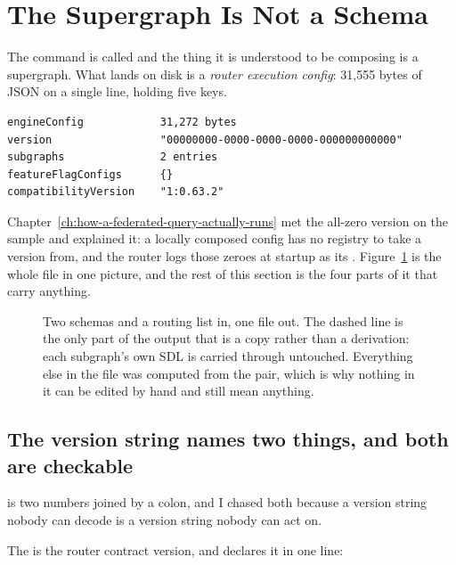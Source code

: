 \section{The Supergraph Is Not a Schema}
\label{sec:ch09-not-a-schema}
%

The command is called  and the thing it is understood to be
composing is a supergraph. What lands on disk is a \emph{router execution
config}: 31{,}555 bytes of JSON on a single line, holding five keys.

\begin{verbatim}
engineConfig            31,272 bytes
version                 "00000000-0000-0000-0000-000000000000"
subgraphs               2 entries
featureFlagConfigs      {}
compatibilityVersion    "1:0.63.2"
\end{verbatim}

Chapter~\ref{ch:how-a-federated-query-actually-runs} met the all-zero version on
the sample and explained it: a locally composed config has no registry to take a
version from, and the router logs those zeroes at startup as its
. Figure~\ref{fig:ch09-config-anatomy} is the whole file
in one picture, and the rest of this section is the four parts of it that carry
anything.

\begin{figure}[htbp]
  \centering
  
  \caption{Two schemas and a routing list in, one file out. The dashed line is
  the only part of the output that is a copy rather than a derivation: each
  subgraph's own SDL is carried through untouched. Everything else in the file
  was computed from the pair, which is why nothing in it can be edited by hand
  and still mean anything.}
  \label{fig:ch09-config-anatomy}
\end{figure}

\subsection*{The version string names two things, and both are checkable}

%
 is two numbers joined by a colon, and I chased both
because a version string nobody can decode is a version string nobody can act
on.

The  is the router contract version, and
 declares it in one line:

